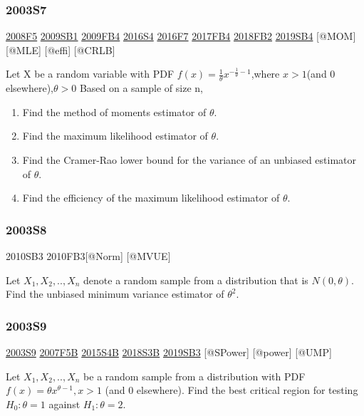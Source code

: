 \documentclass[6pt,Portrait]{article}
\begin{document}
\hypertarget{s7}{%
\subsubsection{2003S7}\label{s7}}

\protect\hyperlink{f5-3}{2008F5} \protect\hyperlink{sb1}{2009SB1}
\protect\hyperlink{fb4}{2009FB4} \protect\hyperlink{s4-4}{2016S4}
\protect\hyperlink{f7-5}{2016F7} \protect\hyperlink{fb4-3}{2017FB4}
\protect\hyperlink{fb2-4}{2018FB2} \protect\hyperlink{sb4-2}{2019SB4}
{[}@MOM{]} {[}@MLE{]} {[}@effi{]} {[}@CRLB{]}

Let X be a random variable with PDF
\(f(x)=\frac1\theta x^{-\frac1\theta-1}\),where \(x>1\)(and 0
elsewhere),\(\theta>0\) Based on a sample of size n,

\begin{enumerate}
\def\labelenumi{\Alph{enumi})}
\item
  Find the method of moments estimator of \(\theta\).
\item
  Find the maximum likelihood estimator of \(\theta\).
\item
  Find the Cramer-Rao lower bound for the variance of an unbiased
  estimator of \(\theta\).
\item
  Find the efficiency of the maximum likelihood estimator of \(\theta\).
\end{enumerate}

\hypertarget{s8}{%
\subsubsection{2003S8}\label{s8}}

2010SB3 2010FB3{[}@Norm{]} {[}@MVUE{]}

Let \(X_1,X_2,..,X_n\) denote a random sample from a distribution that
is \(N(0,\theta)\). Find the unbiased minimum variance estimator of
\(\theta^2\).

\hypertarget{s9}{%
\subsubsection{2003S9}\label{s9}}

\protect\hyperlink{s9}{2003S9} \protect\hyperlink{f5b}{2007F5B}
\protect\hyperlink{s4b-1}{2015S4B} \protect\hyperlink{s3b-2}{2018S3B}
\protect\hyperlink{sb3-3}{2019SB3} {[}@SPower{]} {[}@power{]} {[}@UMP{]}

Let \(X_1,X_2,..,X_n\) be a random sample from a distribution with PDF
\(f(x)=\theta x^{\theta-1}, x>1\) (and 0 elsewhere). Find the best
critical region for testing \(H_0:\theta=1\) against \(H_1:\theta=2\).
\end{document}
